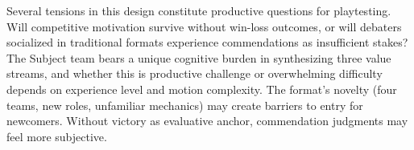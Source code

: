 Several tensions in this design constitute productive questions for playtesting. Will competitive motivation survive without win-loss outcomes, or will debaters socialized in traditional formats experience commendations as insufficient stakes? The Subject team bears a unique cognitive burden in synthesizing three value streams, and whether this is productive challenge or overwhelming difficulty depends on experience level and motion complexity. The format's novelty (four teams, new roles, unfamiliar mechanics) may create barriers to entry for newcomers. Without victory as evaluative anchor, commendation judgments may feel more subjective.